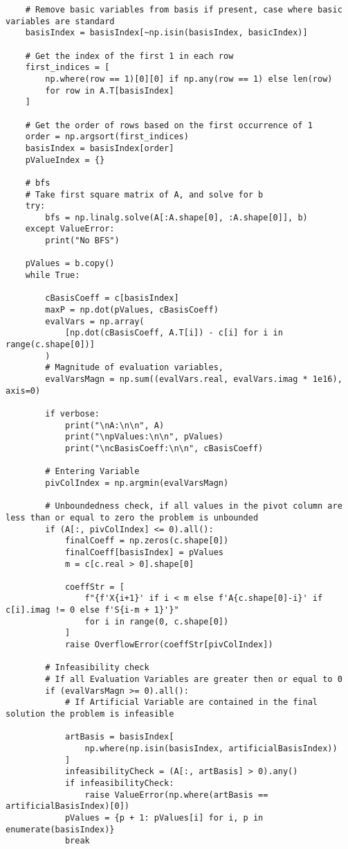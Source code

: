 \documentclass[letterpaper, a4paper]{article}
\begin{document}
\begin{verbatim}
    # Remove basic variables from basis if present, case where basic variables are standard
    basisIndex = basisIndex[~np.isin(basisIndex, basicIndex)]

    # Get the index of the first 1 in each row
    first_indices = [
        np.where(row == 1)[0][0] if np.any(row == 1) else len(row)
        for row in A.T[basisIndex]
    ]

    # Get the order of rows based on the first occurrence of 1
    order = np.argsort(first_indices)
    basisIndex = basisIndex[order]
    pValueIndex = {}

    # bfs
    # Take first square matrix of A, and solve for b
    try:
        bfs = np.linalg.solve(A[:A.shape[0], :A.shape[0]], b)
    except ValueError:
        print("No BFS")

    pValues = b.copy()
    while True:

        cBasisCoeff = c[basisIndex]
        maxP = np.dot(pValues, cBasisCoeff)
        evalVars = np.array(
            [np.dot(cBasisCoeff, A.T[i]) - c[i] for i in range(c.shape[0])]
        )
        # Magnitude of evaluation variables,
        evalVarsMagn = np.sum((evalVars.real, evalVars.imag * 1e16), axis=0)

        if verbose:
            print("\nA:\n\n", A)
            print("\npValues:\n\n", pValues)
            print("\ncBasisCoeff:\n\n", cBasisCoeff)

        # Entering Variable
        pivColIndex = np.argmin(evalVarsMagn)

        # Unboundedness check, if all values in the pivot column are less than or equal to zero the problem is unbounded
        if (A[:, pivColIndex] <= 0).all():
            finalCoeff = np.zeros(c.shape[0])
            finalCoeff[basisIndex] = pValues
            m = c[c.real > 0].shape[0]

            coeffStr = [
                f"{f'X{i+1}' if i < m else f'A{c.shape[0]-i}' if c[i].imag != 0 else f'S{i-m + 1}'}"
                for i in range(0, c.shape[0])
            ]
            raise OverflowError(coeffStr[pivColIndex])

        # Infeasibility check
        # If all Evaluation Variables are greater then or equal to 0
        if (evalVarsMagn >= 0).all():
            # If Artificial Variable are contained in the final solution the problem is infeasible

            artBasis = basisIndex[
                np.where(np.isin(basisIndex, artificialBasisIndex))
            ]
            infeasibilityCheck = (A[:, artBasis] > 0).any()
            if infeasibilityCheck:
                raise ValueError(np.where(artBasis == artificialBasisIndex)[0])
            pValues = {p + 1: pValues[i] for i, p in enumerate(basisIndex)}
            break


\end{verbatim}
\end{document}
